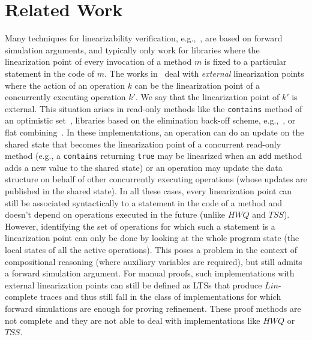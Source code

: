 \vspace{-3.5mm}
\section{Related Work}
\vspace{-1.5mm}
Many techniques for linearizability verification, e.g.,~\cite{conf/ppopp/VafeiadisHHS06,conf/cav/AmitRRSY07,conf/vmcai/Vafeiadis09,conf/tacas/AbdullaHHJR13}, are based on forward simulation arguments, and typically only work for libraries where the linearization point of every invocation of a method $m$ is fixed to a particular statement in the code of $m$. The works in~\cite{conf/cav/Vafeiadis10,Derrick2011,conf/cav/DragoiGH13,DBLP:conf/cav/ZhuPJ15} deal with \emph{external} linearization points where the action of an operation $k$ can be the linearization point of a concurrently executing operation $k'$. We say that the linearization point of $k'$ is external. This situation arises in read-only methods like the {\tt contains} method of an optimistic set~\cite{conf/podc/OHearnRVYY10}, libraries based on the elimination back-off scheme, e.g.,~\cite{conf/spaa/HendlerSY04}, or flat combining~\cite{DBLP:conf/spaa/HendlerIST10,DBLP:conf/podc/GorelikH13}. 
In these implementations, an operation can do an update on the shared state that becomes the linearization point of a concurrent read-only method (e.g., a {\tt contains} returning {\tt true} may be linearized when an {\tt add} method adds a new value to the shared state) or an operation may update the data structure on behalf of other concurrently executing operations (whose updates are published in the shared state). In all these cases, every linearization point can still be associated syntactically to a statement in the code of a method and doesn't depend on operations executed in the future (unlike $\mathit{HWQ}$ and $\mathit{TSS}$). However, identifying the set of operations for which such a statement is a linearization point can only be done by looking at the whole program state (the local states of all the active operations). This poses a problem in the context of compositional reasoning (where auxiliary variables are required), but still admits a forward simulation argument. For manual proofs, such implementations with external linearization points can still be defined as LTSs that produce $Lin$-complete traces and thus still fall in the class of implementations for which forward simulations are enough for proving refinement. These proof methods are not complete and they are not able to deal with implementations like $\mathit{HWQ}$ or $\mathit{TSS}$.

